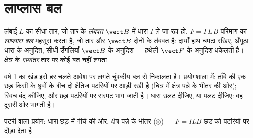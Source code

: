 \section{लाप्लास बल}

\begin{proposition}[लाप्लास बल]\label{prop:g11:magnetic-fields:laplace}
लंबाई $L$ का सीधा तार, जो तार के \emph{लंबवत} 
$\vect B$ में धारा $I$ ले जा रहा हो, $F = I\,L\,B$ परिमाण का \emph{लाप्लास
बल} महसूस करता है, जो तार और $\vect B$ दोनों के लंबवत है:
दायाँ हाथ चपटा रखिए, अँगूठा धारा के अनुदिश, सीधी उँगलियाँ $\vect B$ के अनुदिश
--- हथेली $\vect F$ के अनुदिश धकेलती है। क्षेत्र के \emph{समांतर} तार
पर कोई बल नहीं लगता।
\end{proposition}
\admitted

\begin{remark}\label{rem:g11:magnetic-fields:rail}
वर्ष 1 का खंड इसे हर चलते आवेश पर लगते चुंबकीय बल से निकालता है।
प्रयोगशाला में: ताँबे की एक छड़ किसी  के ध्रुवों के बीच दो
क्षैतिज पटरियों पर आड़ी रखी है (चित्र में क्षेत्र पन्ने के भीतर की
ओर); स्विच बंद कीजिए, और छड़ पटरियों पर सरपट भाग जाती है। धारा उलट दीजिए, या
 पलट दीजिए: वह दूसरी ओर भागती है।
\end{remark}

\begin{omfigure}

{\small पटरी वाला प्रयोग: धारा छड़ में नीचे की ओर, क्षेत्र पन्ने के
भीतर ($\otimes$) ---  $F = ILB$ छड़ को पटरियों पर दौड़ा देता
है।}
\end{omfigure}

